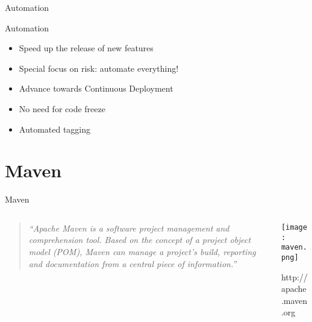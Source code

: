 \documentclass[presentation]{beamer}
\begin{document}
{
\begin{frame}[label=sec-1-3]{Automation}

\begin{block}{Automation}

\begin{itemize}
\item Speed up the release of new features
\item Special focus on risk: automate everything!
\item Advance towards Continuous Deployment
\item No need for code freeze
\item Automated tagging
\end{itemize}
\end{block}
\end{frame}} %

\section{Maven}
\label{sec-2}

{
\begin{frame}[label=sec-2-1]{Maven}

\begin{columns}
\begin{column}{0.6\textwidth}
\begin{quotation} %

\textit{``Apache Maven is a software project management and comprehension tool. Based on the concept of a project object model (POM), Maven can manage a project's build, reporting and documentation from a central piece of information.''}
\end{quotation}
\end{column}

\begin{column}{0.4\textwidth}
\texttt{[image: maven.png]}

\small{http://apache.maven.org}
\end{column}
\end{columns}
\end{frame}} %
\end{document}
